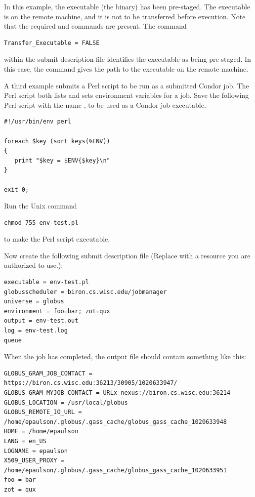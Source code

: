 In this example, the executable (the binary) has been pre-staged.
The executable is on the remote machine, and it is not to
be transferred before execution.
Note that the required 
 and 
commands are present.
The command
\begin{verbatim}
Transfer_Executable = FALSE
\end{verbatim}
within the submit description file identifies the executable
as being pre-staged.
In this case, the 
command gives the path to the executable on the remote machine.

A third example submits a Perl script to be run as a submitted
Condor job.
The Perl script both lists and sets
environment variables for a job.
Save the following Perl script with the name ,
to be used as a Condor job executable.

\begin{verbatim}
#!/usr/bin/env perl

foreach $key (sort keys(%ENV))
{
   print "$key = $ENV{$key}\n"
}

exit 0;
\end{verbatim}

Run the Unix command
\begin{verbatim}
chmod 755 env-test.pl
\end{verbatim}
to make the Perl script executable.

Now create the following submit description file
(Replace  with a resource
you are authorized to use.):

\footnotesize
\begin{verbatim}
executable = env-test.pl
globusscheduler = biron.cs.wisc.edu/jobmanager
universe = globus
environment = foo=bar; zot=qux
output = env-test.out
log = env-test.log
queue
\end{verbatim}
\normalsize

When the job has completed, the output file 
should contain something like this:

\footnotesize
\begin{verbatim}
GLOBUS_GRAM_JOB_CONTACT = https://biron.cs.wisc.edu:36213/30905/1020633947/
GLOBUS_GRAM_MYJOB_CONTACT = URLx-nexus://biron.cs.wisc.edu:36214
GLOBUS_LOCATION = /usr/local/globus
GLOBUS_REMOTE_IO_URL = /home/epaulson/.globus/.gass_cache/globus_gass_cache_1020633948
HOME = /home/epaulson
LANG = en_US
LOGNAME = epaulson
X509_USER_PROXY = /home/epaulson/.globus/.gass_cache/globus_gass_cache_1020633951
foo = bar
zot = qux
\end{verbatim}
\normalsize


